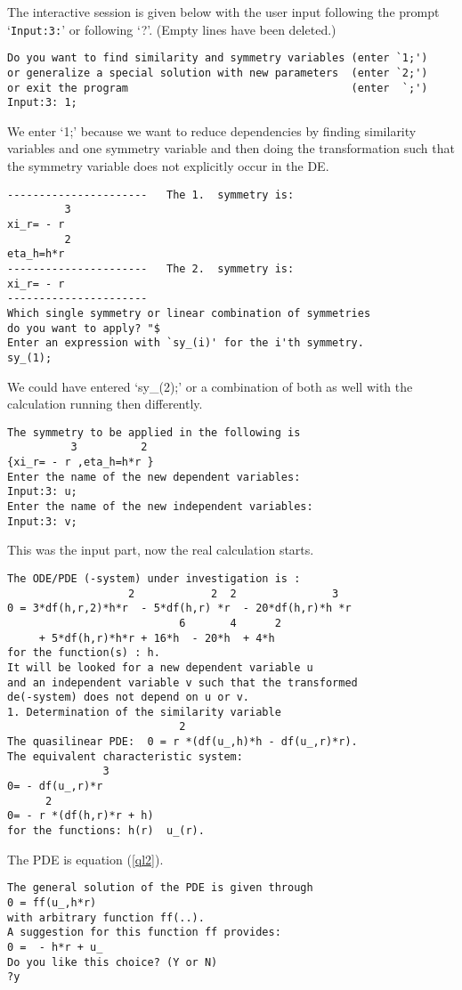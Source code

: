 The interactive session is given below with the user input following
the prompt `{\tt Input:3:}' or following `?'. (Empty lines have been deleted.)
\small \begin{verbatim}
Do you want to find similarity and symmetry variables (enter `1;')
or generalize a special solution with new parameters  (enter `2;')
or exit the program                                   (enter  `;')
Input:3: 1;
\end{verbatim} \normalsize
We enter `1;' because we want to reduce dependencies by finding similarity
variables and one symmetry variable and then doing the transformation such
that the symmetry variable does not explicitly occur in the DE.
\small \begin{verbatim}
----------------------   The 1.  symmetry is:
         3
xi_r= - r
         2
eta_h=h*r
----------------------   The 2.  symmetry is:
xi_r= - r
----------------------
Which single symmetry or linear combination of symmetries
do you want to apply? "$
Enter an expression with `sy_(i)' for the i'th symmetry.
sy_(1);
\end{verbatim} \normalsize
We could have entered `sy\_(2);' or a combination of both
as well with the calculation running then
differently.
\small \begin{verbatim}
The symmetry to be applied in the following is
          3          2
{xi_r= - r ,eta_h=h*r }
Enter the name of the new dependent variables:
Input:3: u;
Enter the name of the new independent variables:
Input:3: v;
\end{verbatim} \normalsize
This was the input part, now the real calculation starts.
\small \begin{verbatim}
The ODE/PDE (-system) under investigation is :
                   2            2  2               3
0 = 3*df(h,r,2)*h*r  - 5*df(h,r) *r  - 20*df(h,r)*h *r
                           6       4      2
     + 5*df(h,r)*h*r + 16*h  - 20*h  + 4*h
for the function(s) : h.
It will be looked for a new dependent variable u
and an independent variable v such that the transformed
de(-system) does not depend on u or v.
1. Determination of the similarity variable
                           2
The quasilinear PDE:  0 = r *(df(u_,h)*h - df(u_,r)*r).
The equivalent characteristic system:
               3
0= - df(u_,r)*r
      2
0= - r *(df(h,r)*r + h)
for the functions: h(r)  u_(r).
\end{verbatim} \normalsize
The PDE is equation (\ref{ql2}).
\small \begin{verbatim}
The general solution of the PDE is given through
0 = ff(u_,h*r)
with arbitrary function ff(..).
A suggestion for this function ff provides:
0 =  - h*r + u_
Do you like this choice? (Y or N)
?y
\end{verbatim} \normalsize
